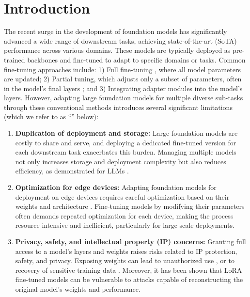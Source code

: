 \section{Introduction}
\label{sec:introduction}
The recent surge in the development of foundation models \citep{clip,BLIP,BLIP2,DinoV2,segment_anything} has significantly advanced a wide range of downstream tasks, achieving state-of-the-art (SoTA) performance across various domains. These models are typically deployed as pre-trained backbones and fine-tuned to adapt to specific domains or tasks. Common fine-tuning approaches include: 1) Full fine-tuning \citep{BERT,ViT}, where all model parameters are updated; 2) Partial tuning, which adjusts only a subset of parameters, often in the model's final layers \citep{rcnn,ViT}; and 3) Integrating adapter modules  \citep{residual_adapters,lora} into the model's layers. 
However, adapting large foundation models for multiple diverse sub-tasks through these conventional methods introduces several significant limitations (which we refer to as ``\WB'' below):


\begin{enumerate}
    \item {\bf Duplication of deployment and storage:} 
    Large foundation models are costly to share and serve, and deploying a dedicated fine-tuned version for each downstream task exacerbates this burden. Managing multiple models not only increases storage and deployment complexity but also reduces efficiency, as demonstrated for LLMs \citep{efficiently_scaling_transformer_inference,prompt_tunning}.

    \item {\bf Optimization for edge devices:} Adapting foundation models for deployment on edge devices requires careful optimization based on their weights and architecture \citep{post_training_prunning,fast_post_training_prunning}. Fine-tuning models by modifying their parameters often demands repeated optimization for each device, making the process resource-intensive and inefficient, particularly for large-scale deployments.

    \item {\bf Privacy, safety, and intellectual property (IP) concerns:} Granting full access to a model's layers and weights raises risks related to IP protection, safety, and privacy. Exposing weights can lead to unauthorized use \citep{gpt4}, or to recovery of sensitive training data \citep{Reconstructing_Training_Data}. Moreover, it has been shown \citep{horwitz2024recovering} that LoRA \citep{lora} fine-tuned models can be vulnerable to attacks capable of reconstructing the original model's weights and performance.


\end{enumerate}

